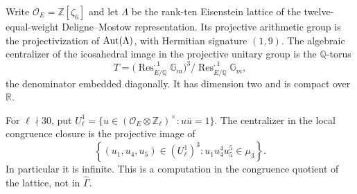 Write \(\mathcal O_E=\mathbb Z[\zeta_6]\) and let
\(\Lambda\) be the rank-ten Eisenstein lattice of the
twelve-equal-weight Deligne--Mostow representation. Its projective
arithmetic group is the projectivization of \(\operatorname{Aut}(\Lambda)\),
with Hermitian signature \((1,9)\). The algebraic centralizer
of the icosahedral image in the projective unitary group is the
\(\mathbb Q\)-torus
\[
 T=\bigl(\operatorname{Res}^{,1}_{E/\mathbb Q}\mathbb G_m\bigr)^3
       /\operatorname{Res}^{,1}_{E/\mathbb Q}\mathbb G_m,
\]
the denominator embedded diagonally. It has dimension two and
is compact over \(\mathbb R\).

For \(\ell\nmid30\), put
\(U_\ell^1=\{u\in(\mathcal O_E\otimes\mathbb Z_\ell)^\times:
u\bar u=1\}\). The centralizer in the local congruence closure
is the projective image of
\[
 \left\{(u_1,u_4,u_5)\in(U_\ell^1)^3:
                 u_1u_4^4u_5^5\in\mu_3\right\}.       \tag{B.23.1}
\]
In particular it is infinite. This is a computation in the
congruence quotient of the lattice, not in \(\widehat\Gamma\).
